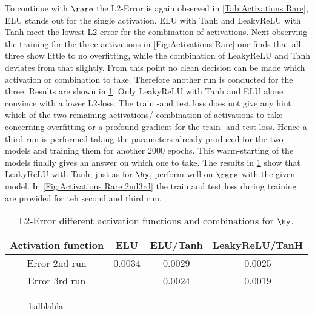 To continue with $\rare$  the L2-Error is again observed in \cref{Tab:Activations Rare}, ELU stands out for the single activation. ELU with Tanh and LeakyReLU with Tanh meet the lowest L2-error for the combination of activations. Next observing the training for the three activations in \cref{Fig:Activations Rare} one finds that all three show little to no overfitting, while the combination of LeakyReLU and Tanh deviates from that slightly. From this point no clean decision can be made which activation or combination to take. Therefore another run is conducted for the three. Results are shown in \cref{Tab:Activations Rare 2nd}. Only LeakyReLU with Tanh and ELU alone convince with a lower L2-loss. The train -and test loss does not give any hint which of the two remaining activations/ combination of activations to take concerning overfitting or a profound gradient for the train -and test loss. Hence a third run is performed taking the parameters already produced for the two models and training them for another 2000 epochs. This warm-starting of the models finally gives an answer on which one to take. The results in \cref{Tab:Activations Rare 2nd} show that LeakyReLU with Tanh, just as for $\hy$, perform well on $\rare$ with the given model. In \cref{Fig:Activations Rare 2nd3rd} the train and test loss during training are provided for teh second and third run. 
\begin{table}[!htbp]\centering
	\begin{tabular}{ |c|c|c|c| }
		\hline
		Activation function & ELU & ELU/Tanh & LeakyReLU/TanH \\ 
		\hline
		Error 2nd run& 0.0034 & 0.0029 & 0.0025\\ \hline
		Error 3rd run& 		  & 0.0024 & 0.0019 \\ \hline
	\end{tabular}
	\caption{L2-Error different activation functions and combinations for $\hy$.}
	\label{Tab:Activations Rare 2nd}
\end{table}
\begin{center}
	\begin{figure}[htbp!]
		\scalebox{.9}{}
		\scalebox{.9}{}
		\scalebox{.9}{}
		\scalebox{.9}{}
		\scalebox{.9}{}
		\scalebox{.9}{}
		\caption{balblabla}
		\label{Fig:Activations Hydro 1}
	\end{figure}
\end{center}
